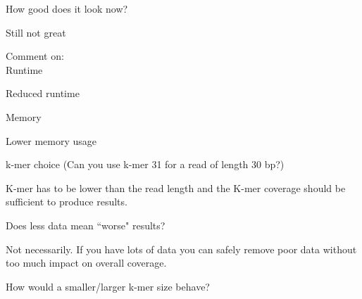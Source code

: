 \begin{questions}
How good does it look now?\\
\begin{answer}
Still not great
\end{answer}
Comment on:\\ 
Runtime
\begin{answer}
Reduced runtime
\end{answer}

Memory
\begin{answer}
Lower memory usage
\end{answer}

k-mer choice (Can you use k-mer 31 for a read of length 30 bp?)
\begin{answer}
K-mer has to be lower than the read length and the K-mer coverage should be
sufficient to produce results.
\end{answer}

Does less data mean ``worse" results?
\begin{answer}
Not necessarily. If you have lots of data you can safely remove poor data
without too much impact on overall coverage.
\end{answer}
  
How would a smaller/larger k-mer size behave?
\begin{answer}
\end{answer}
\end{questions}

